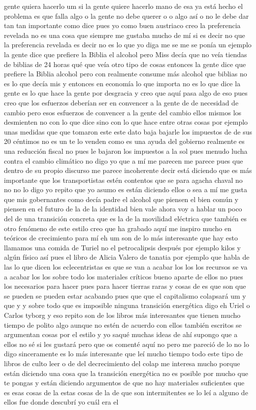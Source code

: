 gente quiera hacerlo um si la gente quiere hacerlo mano de esa ya está hecho el problema es que falla algo o la gente no debe querer o o algo así o no le debe dar tan tan importante como dice pues yo como buen austriaco creo la preferencia revelada no es una cosa que siempre me gustaba mucho de mí si es decir no que la preferencia revelada es decir no es lo que yo diga me se me se ponía un ejemplo la gente dice que prefiere la Biblia el alcohol pero Miss decía que no veía tiendas de biblias de 24 horas qué que veía otro tipo de cosas entonces la gente dice que prefiere la Biblia alcohol pero con realmente consume más alcohol que biblias no es lo que decía mis y entonces en economía lo que importa no es lo que dice la gente es lo que hace la gente por desgracia y creo que aquí pasa algo de eso pues creo que los esfuerzos deberían ser en convencer a la gente de de necesidad de cambio pero esos esfuerzos de convencer a la gente del cambio ellos mismos los desmienten no con lo que dice sino con lo que hace entre otras cosas por ejemplo unas medidas que que tomaron este este dato baja bajarle los impuestos de de sus 20 céntimos no es un te lo venden como es una ayuda del gobierno realmente es una reducción fiscal no pues le bajaron los impuestos a la sol pues menudo lucha contra el cambio climático no digo yo que a mí me parecen me parece pues que dentro de su propio discurso me parece incoherente decir está diciendo que es más importante que los transportistas estén contentos que se para agacha chaval no no no lo digo yo repito que yo asumo es están diciendo ellos o sea a mí me gusta que mis gobernantes como decía padre el alcohol que piensen el bien común y piensen en el futuro de la de la identidad bien vale ahora voy a hablar un poco del de una transición concreta que es la de la movilidad eléctrica que también es otro fenómeno de este estilo creo que ha grabado aquí me inspiro mucho en teóricos de crecimiento para mí eh um son de lo más interesante que hay esto llamamos una comida de Turiel no el petrocalipsis después por ejemplo kilos y algún físico así pues el libro de Alicia Valero de tanatia por ejemplo que habla de las lo que dicen los eclecentristas es que se van a acabar los los los recursos se va a acabar los los sobre todo los materiales críticos bueno aparte de ellos no pues los necesarios para hacer pues para hacer tierras raras y cosas de es que son que se pueden se pueden estar acabando pues que que el capitalismo colapsará um y que y y sobre todo que es imposible ninguna transición energética digo eh Uriel o Carlos tyborg y eso repito son de los libros más interesantes que tienen mucho tiempo de polito algo aunque no estén de acuerdo con ellos también escritos se argumentan cosas por el estilo y yo saqué muchas ideas de ahí supongo que a ellos no sé si les gustará pero que os comenté aquí no pero me pareció de lo no lo digo sinceramente es lo más interesante que leí mucho tiempo todo este tipo de libros de culto leer o de del decrecimiento del colap me interesa mucho porque están diciendo una cosa que la transición energética no es posible por mucho que te pongas y están diciendo argumentos de que no hay materiales suficientes que es esas cosas de la estas cosas de la de que son intermitentes se lo leí a alguno de ellos fue donde descubrí yo cuál era el 